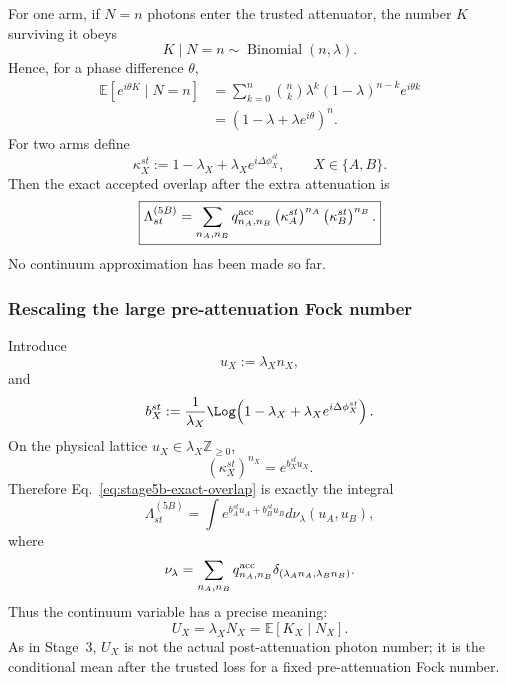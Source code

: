 \documentclass[11pt]{article}
\theoremstyle{remark}
\begin{document}
For one arm, if \(N=n\) photons enter the trusted attenuator, the number
\(K\) surviving it obeys
\begin{equation}
    K\mid N=n
    \sim
    \operatorname{Binomial}(n,\lambda).
    \label{eq:stage5b-thinning}
\end{equation}
Hence, for a phase difference \(\theta\),
\begin{align}
    \mathbb E[
      e^{i\theta K}
      \mid N=n
    ]
    &=
    \sum_{k=0}^{n}
    \binom nk
    \lambda^k(1-\lambda)^{n-k}
    e^{i\theta k}
    \nonumber\\
    &=
    \boxed{
    \left(
      1-\lambda+\lambda e^{i\theta}
    \right)^n.
    }
    \label{eq:stage5b-binomial-kernel}
\end{align}
For two arms define
\[
    \kappa_X^{st}
    :=
    1-\lambda_X
    +
    \lambda_X e^{i\Delta\phi_X^{st}},
    \qquad
    X\in\{A,B\}.
\]
Then the exact accepted overlap after the extra attenuation is
\begin{equation}
    \boxed{
    \Lambda_{st}^{(5B)}
    =
    \sum_{n_A,n_B}
    q^{\rm acc}_{n_A,n_B}
    \left(\kappa_A^{st}\right)^{n_A}
    \left(\kappa_B^{st}\right)^{n_B}.
    }
    \label{eq:stage5b-exact-overlap}
\end{equation}
No continuum approximation has been made so far.

\subsubsection{Rescaling the large pre-attenuation Fock number}

Introduce
\begin{equation}
    u_X
    :=
    \lambda_X n_X,
    \label{eq:stage5b-u-def}
\end{equation}
and
\begin{equation}
    b_X^{st}
    :=
    \frac{1}{\lambda_X}
    \Log\!\left(
      1-\lambda_X
      +
      \lambda_Xe^{i\Delta\phi_X^{st}}
    \right).
    \label{eq:stage5b-b-def}
\end{equation}
On the physical lattice \(u_X\in\lambda_X\mathbb Z_{\ge0}\),
\begin{equation}
    \left(\kappa_X^{st}\right)^{n_X}
    =
    e^{b_X^{st}u_X}.
    \label{eq:stage5b-lattice-identity}
\end{equation}
Therefore Eq.~\eqref{eq:stage5b-exact-overlap} is exactly the integral
\begin{equation}
    \Lambda_{st}^{(5B)}
    =
    \int
    e^{
      b_A^{st}u_A+b_B^{st}u_B
    }
    d\nu_\lambda(u_A,u_B),
    \label{eq:stage5b-lattice-measure}
\end{equation}
where
\begin{equation}
    \nu_\lambda
    =
    \sum_{n_A,n_B}
    q^{\rm acc}_{n_A,n_B}
    \delta_{
      (\lambda_A n_A,\lambda_B n_B)
    }.
    \label{eq:stage5b-pushforward}
\end{equation}
Thus the continuum variable has a precise meaning:
\[
    \boxed{
    U_X=\lambda_XN_X
    =
    \mathbb E[K_X\mid N_X].
    }
\]
As in Stage~3, \(U_X\) is not the actual post-attenuation photon number; it is
the conditional mean after the trusted loss for a fixed pre-attenuation Fock
number.
\end{document}

